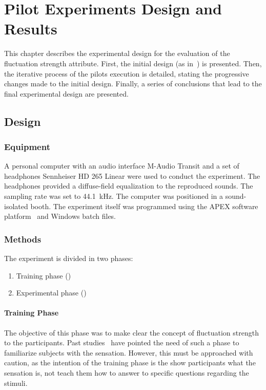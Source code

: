 \documentclass[../main.tex]{subfiles}
\begin{document}
\chapter{Pilot Experiments Design and Results}

This chapter describes the experimental design for the evaluation of the
fluctuation strength attribute. First, the initial design (as
in~\cite{Fastl1982Fluctuation}) is presented. Then, the iterative process of the
pilots execution is detailed, stating the progressive changes made to the
initial design. Finally, a series of conclusions that lead to the final
experimental design are presented.

\section{Design}

\subsection{Equipment}
\label{subsec:pilot_equipment}

A personal computer with an audio interface M-Audio Transit and a set of
headphones Sennheiser HD 265 Linear were used to conduct the experiment. The
headphones provided a diffuse-field equalization to the reproduced sounds. The
sampling rate was set to 44.1~kHz. The computer was positioned in a
sound-isolated booth. The experiment itself was programmed using the APEX
software platform~\cite{Francart2008} and Windows batch files.

\subsection{Methods}

The experiment is divided in two phases:
\begin{enumerate}
  \item Training phase ()
  \item Experimental phase ()
\end{enumerate}

\subsubsection{Training Phase}
\label{subsub:training_phase}

The objective of this phase was to make clear the concept of fluctuation
strength to the participants. Past studies~\cite{Accolti2009Fluctuation} have
pointed the need of such a phase to familiarize subjects with the sensation.
However, this must be approached with caution, as the intention of the training
phase is the show participants what the sensation is, not teach them how to
answer to specific questions regarding the stimuli.
\end{document}
